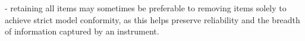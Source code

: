 - retaining all items may sometimes be preferable to removing items solely to achieve strict model conformity, as this helps preserve reliability and the breadth of information captured by an instrument. 


